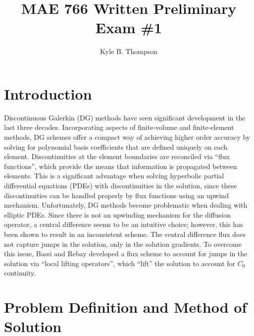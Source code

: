 \documentclass[a4paper]{article}
\title{MAE 766 Written Preliminary Exam \#1}
\author{ Kyle B. Thompson }
\begin{document}
\maketitle

\section{Introduction}
Discontinuous Galerkin (DG) methods have seen significant development in the last
three decades.  Incorporating aspects of finite-volume and finite-element
methods, DG schemes offer a compact way of achieving higher order accuracy by
solving for polynomial basis coefficients that are defined uniquely on each
element.  Discontinuities at the element boundaries are reconciled via ``flux
functions'', which provide the means that information is propagated between
elements.  This is a significant advantage when solving hyperbolic partial
differential equations (PDEs) with discontinuities in the solution, since these
discontinuities can be handled properly by flux functions using an upwind
mechanism.  Unfortunately, DG methods become problematic when dealing with
elliptic PDEs.  Since there is not an upwinding mechanism for the diffusion
operator, a central difference seems to be an intuitive choice; however, this
has been shown to result in an inconsistent scheme. The central difference flux
does not capture jumps in the solution, only in the solution gradients.  To
overcome this issue, Bassi and Rebay developed a flux scheme\cite{br2} to account for
jumps in the solution via ``local lifting operators'', which ``lift'' the
solution to account for $C_0$ continuity.

\section{Problem Definition and Method of Solution}
\end{document}
